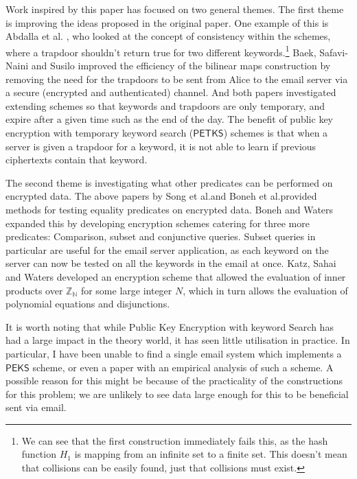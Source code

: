 \documentclass[a4paper,11pt]{article}
\begin{document}
    Work inspired by this paper has focused on two general themes. The first theme is improving the ideas proposed in the original paper. One example of this is Abdalla et al. \cite{abdalla:se-revisited}, who looked at the concept of consistency within the schemes, where a trapdoor shouldn't return true for two different keywords.\footnote{We can see that the first construction immediately fails this, as the hash function $H_1$ is mapping from an infinite set to a finite set. This doesn't mean that collisions can be easily found, just that collisions must exist.} Baek, Safavi-Naini and Susilo \cite{baek:se-revisited} improved the efficiency of the bilinear maps construction by removing the need for the trapdoors to be sent from Alice to the email server via a secure (encrypted and authenticated) channel. And both papers investigated extending schemes so that keywords and trapdoors are only temporary, and expire after a given time such as the end of the day. The benefit of public key encryption with temporary keyword search ($\mathsf{PETKS}$) schemes is that when a server is given a trapdoor for a keyword, it is not able to learn if previous ciphertexts contain that keyword.

    The second theme is investigating what other predicates can be performed on encrypted data. The above papers by Song et al.\@ and Boneh et al.\@ provided methods for testing equality predicates on encrypted data. Boneh and Waters \cite{boneh:predicate} expanded this by developing encryption schemes catering for three more predicates: Comparison, subset and conjunctive queries. Subset queries in particular are useful for the email server application, as each keyword on the server can now be tested on all the keywords in the email at once. Katz, Sahai and Waters \cite{katz:predicate} developed an encryption scheme that allowed the evaluation of inner products over $\mathbb{Z_N}$ for some large integer $N$, which in turn allows the evaluation of polynomial equations and disjunctions.

    It is worth noting that while Public Key Encryption with keyword Search has had a large impact in the theory world, it has seen little utilisation in practice. In particular, I have been unable to find a single email system which implements a $\mathsf{PEKS}$ scheme, or even a paper with an empirical analysis of such a scheme. A possible reason for this might be because of the practicality of the constructions for this problem; we are unlikely to see data large enough for this to be beneficial sent via email.
\end{document}
